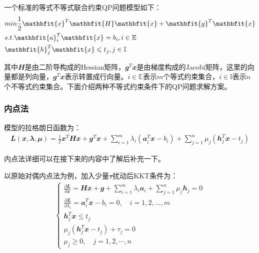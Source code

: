 一个标准的等式不等式联合约束QP问题模型如下：
\begin{align}
  &min \quad \frac{1}{2}\mathbfit{x}^T\mathbfit{H}\mathbfit{x}+\mathbfit{g}^T\mathbfit{x} \notag\\
  &s.t. \quad \mathbfit{a}_i^T\mathbfit{x}=b_i, \quad i \in \mathbb{E}\\
  &\quad \mathbfit{h}_j^T\mathbfit{x}\leq t_j, \quad j \in \mathbb{I} 
\end{align}

其中$\mathbfit{H}$是由二阶导构成的Hessian矩阵，$\mathbfit{g}^T\mathbfit{x}$是由梯度构成的Jacobi矩阵，这里的向量都是列向量，$\mathbfit{g}^T\mathbfit{x}$表示转置成行向量。$i \in \mathbb{E}$表示$m$个等式约束集合，$i \in \mathbb{I}$表示$n$个不等式约束集合。下面介绍两种不等式约束条件下的QP问题求解方案。
\subsubsection{内点法}
模型的拉格朗日函数为：
\begin{align}
  \mathbfit{L}(\mathbfit{x},\mathbfit{\lambda}, \mathbfit{\mu})=\frac{1}{2}\mathbfit{x}^T\mathbfit{H}\mathbfit{x}+\mathbfit{g}^T\mathbfit{x}+\sum_{i=1}^{m}\lambda_i(\mathbfit{a}_i^T\mathbfit{x}-b_i)+\sum_{j=1}^{n}\mu_j(\mathbfit{h}_j^T\mathbfit{x}-t_j)
\end{align}

\begin{note}
  内点法详细可以在接下来的内容中了解后补充一下。
\end{note}
以原始对偶内点法为例，加入少量$\mathbfit{\tau}$扰动后KKT条件为：
\begin{align}
  \begin{cases}
    \frac{\partial \mathbfit{L}}{\partial \mathbfit{x}}=\mathbfit{H}\mathbfit{x}+\mathbfit{g}+\sum_{i=1}^{m}\lambda_i\mathbfit{a}_i+\sum_{j=1}^{n}\mu_j\mathbfit{h}_j=0\\
    \frac{\partial \mathbfit{L}}{\partial \lambda_i}=\mathbfit{a}_i^T\mathbfit{x}-b_i=0, \quad i = 1, 2, \dots, m\\
    \mathbfit{h}_j^T\mathbfit{x}\leq t_j\\
    \mu_j(\mathbfit{h}_j^T\mathbfit{x}-t_j)+\tau_j=0\\
    \mu_j\geq 0, \quad j= 1, 2, \cdots, n
  \end{cases}
\end{align}

